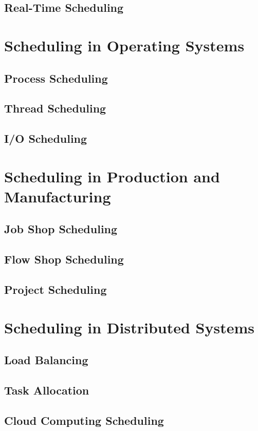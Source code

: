 \documentclass[12pt]{book} %
\begin{document}
\subsection{Real-Time Scheduling}

\section{Scheduling in Operating Systems}
\subsection{Process Scheduling}
\subsection{Thread Scheduling}
\subsection{I/O Scheduling}

\section{Scheduling in Production and Manufacturing}
\subsection{Job Shop Scheduling}
\subsection{Flow Shop Scheduling}
\subsection{Project Scheduling}

\section{Scheduling in Distributed Systems}
\subsection{Load Balancing}
\subsection{Task Allocation}
\subsection{Cloud Computing Scheduling}
\end{document}
